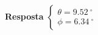 
\textbf{Resposta}
$
\begin{cases}
	\theta=\SI{9.52}{^{\circ}}\\
	\phi=\SI{6.34}{^{\circ}}
\end{cases}
$